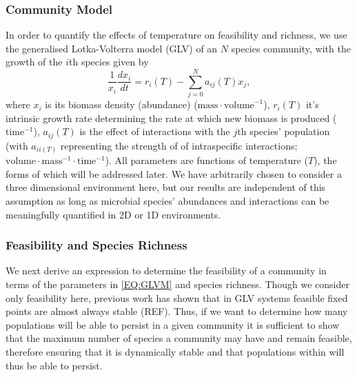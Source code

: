 \documentclass{article}
\begin{document}
\subsubsection*{Community Model}
In order to quantify the effects of temperature on feasibility and richness, we use the generalised Lotka-Volterra model (GLV) of an $N$ species community, with the growth of the $i$th species given by
\begin{equation} \label{EQ:GLVM}
  \frac{1}{x_i} \frac{dx_i}{dt} = r_i(T) - \sum^N_{j = 0} a_{ij}(T) x_j, 
\end{equation}
where $x_i$ is its biomass density (abundance) ($\text{mass} \cdot \text{volume}^{-1}$), $r_i(T)$ it's intrinsic growth rate determining the rate at which new biomass is produced ($\text{time}^{-1}$), $a_{ij}(T)$ is the effect of interactions with the $j$th species' population (with $a_{ii(T)}$ representing the strength of of intraspecific interactions; $\text{volume} \cdot \text{mass}^{-1} \cdot \text{time}^{-1}$). All parameters are functions of temperature ($T$), the forms of which will be addressed later. We have arbitrarily chosen to consider a three dimensional environment here, but our results are independent of this assumption as long as microbial species' abundances and interactions can be meaningfully quantified in 2D or 1D environments.  

\subsubsection*{Feasibility and Species Richness} \label{SEC:Feas_SP_rich}

We next derive an expression to determine the feasibility of a community in terms of the parameters in \cref{EQ:GLVM} and species richness. Though we consider only feasibility here, previous work has shown that in GLV systems feasible fixed points are almost always stable (REF). Thus, if we want to determine how many populations will be able to persist in a given community it is sufficient to show that the maximum number of species a community may have and remain feasible, therefore ensuring that it is dynamically stable and that populations within will thus be able to persist. 
\end{document}
